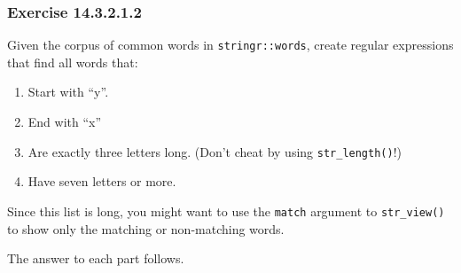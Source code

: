 \documentclass[]{book}
\providecommand{\tightlist}{%
  \setlength{\itemsep}{0pt}\setlength{\parskip}{0pt}}
\theoremstyle{plain}
\theoremstyle{remark}
\begin{document}
\hypertarget{exercise-14.3.2.1.2}{%
\subsubsection*{\texorpdfstring{Exercise {14.3.2.1.2}}{Exercise 14.3.2.1.2}}\label{exercise-14.3.2.1.2}}

Given the corpus of common words in \texttt{stringr::words}, create regular expressions that find all words that:

\begin{enumerate}
\def\labelenumi{\arabic{enumi}.}
\tightlist
\item
  Start with ``y''.
\item
  End with ``x''
\item
  Are exactly three letters long. (Don't cheat by using \texttt{str\_length()}!)
\item
  Have seven letters or more.
\end{enumerate}

Since this list is long, you might want to use the \texttt{match} argument to \texttt{str\_view()} to show only the matching or non-matching words.

The answer to each part follows.
\end{document}

